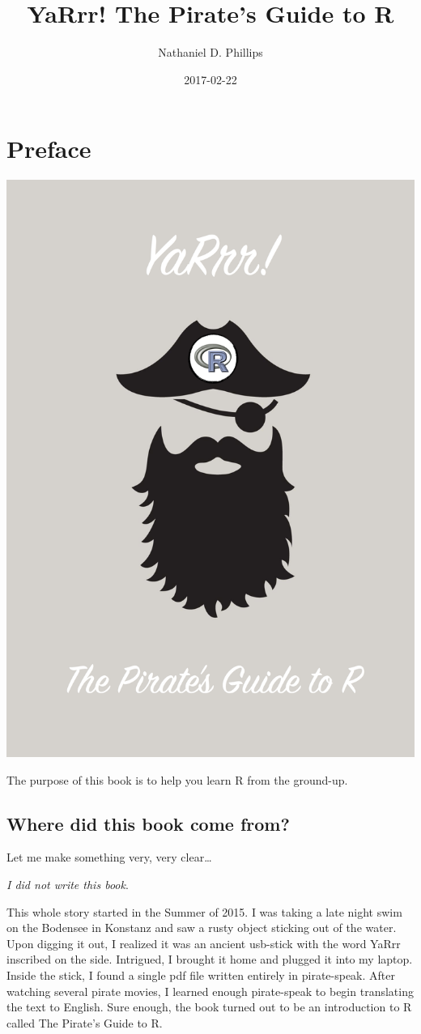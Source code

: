 \documentclass[]{book}
\title{YaRrr! The Pirate's Guide to R}
\author{Nathaniel D. Phillips}
\date{2017-02-22}
\begin{document}
\maketitle

{
\setcounter{tocdepth}{1}
\tableofcontents
}
\chapter{Preface}\label{intro}

\begin{center}\includegraphics[width=0.75\linewidth]{images/YaRrr_Cover} \end{center}

The purpose of this book is to help you learn R from the ground-up.

\section{Where did this book come
from?}\label{where-did-this-book-come-from}

Let me make something very, very clear\ldots{}

\emph{I did not write this book}.

This whole story started in the Summer of 2015. I was taking a late
night swim on the Bodensee in Konstanz and saw a rusty object sticking
out of the water. Upon digging it out, I realized it was an ancient
usb-stick with the word YaRrr inscribed on the side. Intrigued, I
brought it home and plugged it into my laptop. Inside the stick, I found
a single pdf file written entirely in pirate-speak. After watching
several pirate movies, I learned enough pirate-speak to begin
translating the text to English. Sure enough, the book turned out to be
an introduction to R called The Pirate's Guide to R.
\end{document}
